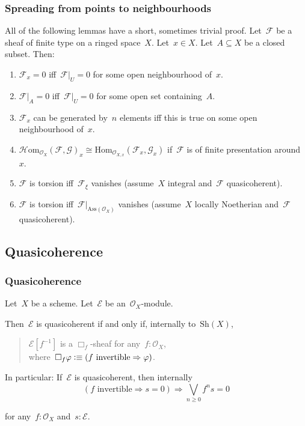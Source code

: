 \documentclass[12pt,utf8,notheorems,compress,t]{beamer}
\newcommand{\E}{\mathcal{E}}
\newcommand{\F}{\mathcal{F}}
\renewcommand{\G}{\mathcal{G}}
\renewcommand{\O}{\mathcal{O}}
\newcommand{\defeqv}{\vcentcolon\equiv}
\newcommand{\Sh}{\mathrm{Sh}}
\newcommand{\Hom}{\mathrm{Hom}}
\renewcommand{\_}{\mathpunct{.}}
\newcommand{\?}{\,{:}\,}
\begin{document}
\begin{frame}\frametitle{Spreading from points to neighbourhoods}
  All of the following lemmas have a short, sometimes trivial proof.
  Let~$\F$ be a sheaf of finite type on a ringed space~$X$.
  Let~$x \in X$. Let~$A \subseteq X$ be a closed subset. Then:
  \small
  \begin{enumerate}
    \item $\F_x = 0$ iff~$\F|_U = 0$ for some open neighbourhood of~$x$.
    \item $\F|_A = 0$ iff~$\F|_U = 0$ for some open set containing~$A$.
    \item $\F_x$ can be generated by~$n$ elements iff this is true on some open
    neighbourhood of~$x$.
    \item $\mathcal{H}\mathrm{om}_{\O_X}(\F,\G)_x \cong
    \Hom_{\O_{X,x}}(\F_x,\G_x)$ if~$\F$ is of finite presentation around~$x$.
    \item $\F$ is torsion iff~$\F_\xi$ vanishes (assume~$X$ integral and~$\F$ quasicoherent).
    \item $\F$ is torsion iff~$\F|_{\mathrm{Ass}(\O_X)}$ vanishes (assume~$X$
    locally Noetherian and~$\F$ quasicoherent).
  \end{enumerate}
\end{frame}


\subsection{Quasicoherence}

\begin{frame}\frametitle{Quasicoherence}
  Let~$X$ be a scheme. Let~$\E$ be an~$\O_X$-module.

  Then~$\E$ is quasicoherent
  if and only if, internally to~$\Sh(X)$,
  \begin{quote}\textnormal{$\E[f^{-1}]$ is a $\Box_f$-sheaf for any~$f : \O_X$, \\[0.3em]
  \qquad\qquad where~$\Box_f\varphi \defeqv (\text{$f$ invertible} \Rightarrow \varphi)$.}
  \end{quote}
  \pause

  In particular: If~$\E$ is quasicoherent, then internally
  \[ (\text{$f$ invertible} \Rightarrow s = 0) \Longrightarrow
    \bigvee_{n \geq 0} f^n s = 0 \]
  \vspace*{-1.5em}\par%
  for any~$f : \O_X$ and~$s : \E$.
\end{frame}
\end{document}
